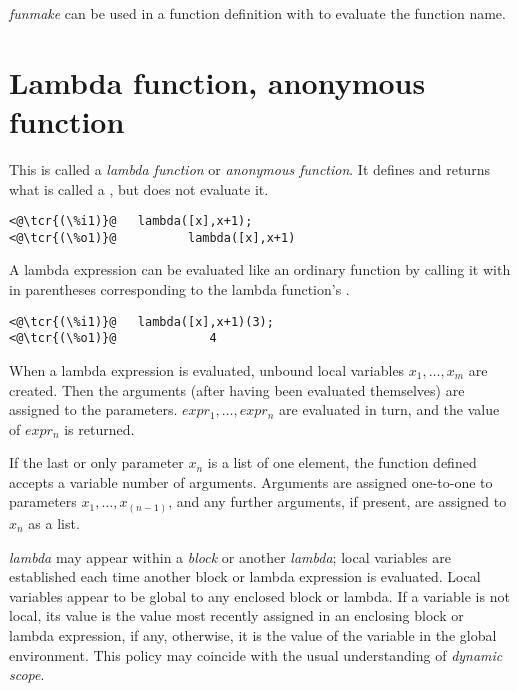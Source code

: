 \documentclass[../Maxima_Workbook.tex]{subfiles}
\begin{document}
\lz \emph{funmake} can be used in a function definition with  to evaluate the function name.

\section{Lambda function, anonymous function}\label{F6}

 \hfill \tcr{[function]}

\lz This is called a \emph{lambda function} or \emph{anonymous function}. It defines and returns what is called a , but does not evaluate it. 

\lz \begin{lstlisting}
<@\tcr{(\%i1)}@   lambda([x],x+1);
<@\tcr{(\%o1)}@			 lambda([x],x+1)
\end{lstlisting}

\lz A lambda expression can be evaluated like an ordinary function by calling it with  in parentheses corresponding to the lambda function's . 

\lz \begin{lstlisting}
<@\tcr{(\%i1)}@   lambda([x],x+1)(3);
<@\tcr{(\%o1)}@				4
\end{lstlisting}

\lz When a lambda expression is evaluated, unbound local variables $ x_1,\dots, x_m $ are created. Then the arguments (after having been evaluated themselves) are assigned to the parameters. $ expr_1,\dots, expr_n $ are evaluated in turn, and the value of \emph{$ expr_n $} is returned.

\lzz {}

\lz If the last or only parameter $ x_n $ is a list of one element, the function defined accepts a variable number of arguments. Arguments are assigned one-to-one to parameters $ x_1, \dots, x_{(n-1)} $, and any further arguments, if present, are assigned to $ x_n $ as a list.

\lz \emph{lambda} may appear within a \emph{block} or another \emph{lambda}; local variables are established each time another block or lambda expression is evaluated. Local variables appear to be global to any enclosed block or lambda. If a variable is not local, its value is the value most recently assigned in an enclosing block or lambda expression, if any, otherwise, it is the value of the variable in the global environment. This policy may coincide with the usual understanding of \emph{dynamic scope}.
\end{document}
